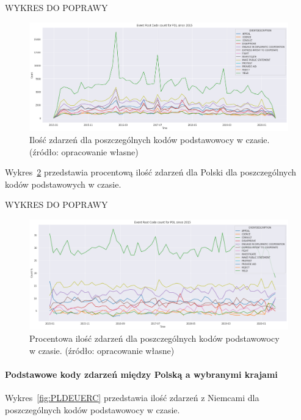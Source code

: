 \documentclass[11pt]{report}
\begin{document}
    WYKRES DO POPRAWY
    \begin{figure}[ht!]
        \centering
        \includegraphics[width=1 \textwidth]{fig/PL/PLERCinTIME.png}
        \caption{Ilość zdarzeń dla poszczególnych kodów podstawowocy w czasie. (źródło: opracowanie własne)}
        \label{fig:PLPERCinTIME}
    \end{figure}

    Wykres~\ref{fig:PLPERCpercinTIME} przedstawia procentową ilość zdarzeń dla Polski dla poszczególnych kodów podstawowych w czasie.

    WYKRES DO POPRAWY
    \begin{figure}[ht!]
        \centering
        \includegraphics[width=1 \textwidth]{fig/PL/PLERCpercinTIME.png}
        \caption{Procentowa ilość zdarzeń dla poszczególnych kodów podstawowocy w czasie. (źródło: opracowanie własne)}
        \label{fig:PLPERCpercinTIME}
    \end{figure}

    \paragraph{Podstawowe kody zdarzeń między Polską a wybranymi krajami}

    Wykres~\ref{fig:PLDEUERC} przedstawia ilość zdarzeń z Niemcami dla poszczególnych kodów podstawowocy w czasie.
\end{document}
